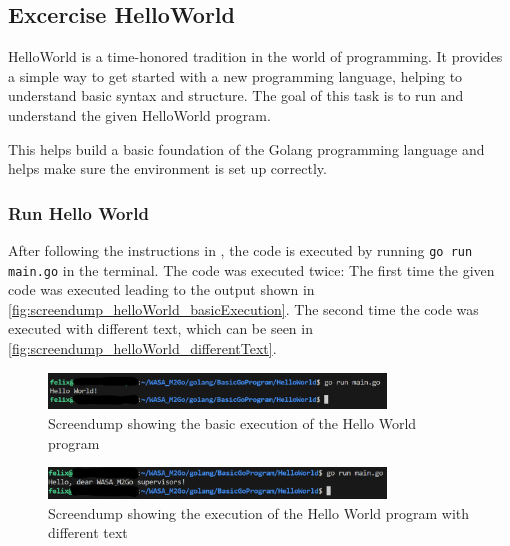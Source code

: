 \subsection{Excercise HelloWorld}
\label{sec:excercise_hello_world}
HelloWorld is a time-honored tradition in the world of programming.
It provides a simple way to get started with a new programming language, helping to understand basic syntax and structure.
The goal of this task is to run and understand the given HelloWorld program.

This helps build a basic foundation of the Golang programming language and helps make sure the environment is set up correctly.

\subsubsection*{Run Hello World}
After following the instructions in \cite{MS-VSC}, the code is executed by running \texttt{go run main.go} in the terminal.
The code was executed twice: The first time the given code was executed leading to the output shown in \autoref{fig:screendump_helloWorld_basicExecution}.
The second time the code was executed with different text, which can be seen in \autoref{fig:screendump_helloWorld_differentText}.

\begin{figure}[H]
    \centering
    \includegraphics[width=0.8\textwidth]{figures/goLang/helloWorld/golang_helloWorld_basicExecution.png}
    \caption{Screendump showing the basic execution of the Hello World program}
    \label{fig:screendump_helloWorld_basicExecution}
\end{figure}

\begin{figure}[H]
    \centering
    \includegraphics[width=0.8\textwidth]{figures/goLang/helloWorld/golang_helloWorld_ExecutionDifferentText.png}
    \caption{Screendump showing the execution of the Hello World program with different text}
    \label{fig:screendump_helloWorld_differentText}
\end{figure}

